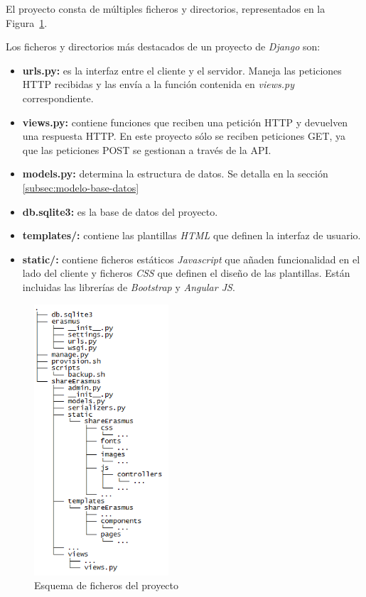 \documentclass[a4paper, 12pt]{book}
\begin{document}
El proyecto consta de múltiples ficheros y directorios, representados en la Figura~\ref{fig:arbol}.


Los ficheros y directorios más destacados de un proyecto de \textit{Django} son:

\begin{itemize}
        \item \textbf{urls.py:} es la interfaz entre el cliente y el servidor. Maneja las peticiones HTTP recibidas y las envía a la función contenida en \textit{views.py} correspondiente.
        \item \textbf{views.py:} contiene funciones que reciben una petición HTTP y devuelven una respuesta HTTP. En este proyecto sólo se reciben peticiones GET, ya que las peticiones POST se gestionan a través de la API.
        \item \textbf{models.py:} determina la estructura de datos. Se detalla en la sección \ref{subsec:modelo-base-datos}
        \item \textbf{db.sqlite3:} es la base de datos del proyecto.
        \item \textbf{templates/:} contiene  las plantillas \textit{HTML} que definen la interfaz de usuario.
        \item \textbf{static/:} contiene ficheros estáticos \textit{Javascript} que añaden funcionalidad en el lado del cliente y ficheros \textit{CSS} que definen el diseño de las plantillas. Están incluidas las librerías de \textit{Bootstrap}  y \textit{Angular JS}.
\end{itemize}

\begin{figure}[H]
  \centering
  \includegraphics[width=5cm, keepaspectratio]{img/arbol.png}
  \caption{Esquema de ficheros del proyecto}
  \label{fig:arbol}
\end{figure}
\end{document}
